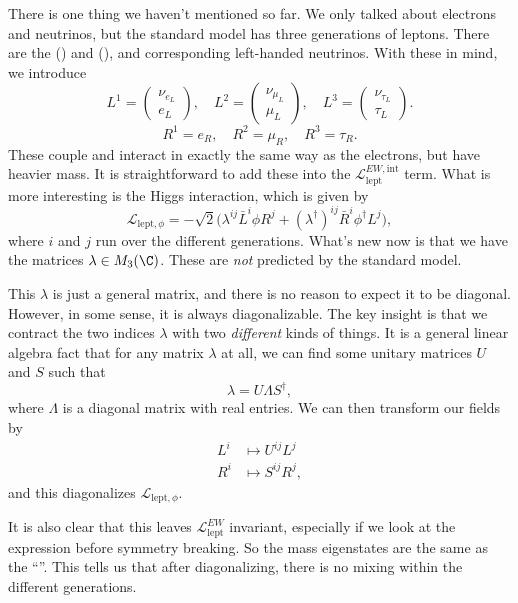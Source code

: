 \documentclass[a4paper]{article}
\begin{document}
There is one thing we haven't mentioned so far. We only talked about electrons and neutrinos, but the standard model has three generations of leptons. There are the  (\term{$\mu$}) and  (\term{$\tau$}), and corresponding left-handed neutrinos. With these in mind, we introduce
\[
  L^1 =
  \begin{pmatrix}
    \nu_{e_L}\\
    e_L
  \end{pmatrix},\quad
  L^2 =
  \begin{pmatrix}
    \nu_{\mu_L}\\
    \mu_L
  \end{pmatrix},\quad
  L^3 =
  \begin{pmatrix}
    \nu_{\tau_L}\\
    \tau_L
  \end{pmatrix}.
\]
\[
  R^1 = e_R,\quad R^2 = \mu_R,\quad R^3 = \tau_R.
\]
These couple and interact in exactly the same way as the electrons, but have heavier mass. It is straightforward to add these into the $\mathcal{L}_{\mathrm{lept}}^{EW, \mathrm{int}}$ term. What is more interesting is the Higgs interaction, which is given by
\[
  \mathcal{L}_{\mathrm{lept}, \phi} = - \sqrt{2} \Big(\lambda^{ij} \bar{L}^i \phi R^j + (\lambda^\dagger)^{ij} \bar{R}^i \phi^\dagger L^j\Big),
\]
where $i$ and $j$ run over the different generations. What's new now is that we have the matrices $\lambda \in M_3(\C)$. These are \emph{not} predicted by the standard model.

This $\lambda$ is just a general matrix, and there is no reason to expect it to be diagonal. However, in some sense, it is always diagonalizable. The key insight is that we contract the two indices $\lambda$ with two \emph{different} kinds of things. It is a general linear algebra fact that for any matrix $\lambda$ at all, we can find some unitary matrices $U$ and $S$ such that
\[
  \lambda = U \Lambda S^\dagger,
\]
where $\Lambda$ is a diagonal matrix with real entries. We can then transform our fields by
\begin{align*}
  L^i &\mapsto U^{ij} L^j\\
  R^i &\mapsto S^{ij} R^j,
\end{align*}
and this diagonalizes $\mathcal{L}_{\mathrm{lept}, \phi}$.

It is also clear that this leaves $\mathcal{L}_{\mathrm{lept}}^{EW}$ invariant, especially if we look at the expression before symmetry breaking. So the mass eigenstates are the same as the ``''. This tells us that after diagonalizing, there is no mixing within the different generations.
\end{document}

